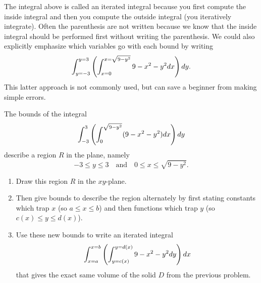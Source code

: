 The integral above is called an iterated integral because you first compute the inside integral and then you compute the outside integral (you iteratively integrate). Often the parenthesis are not written because we know that the inside integral should be performed first without writing the parenthesis. We could also explicitly emphasize which variables go with each bound by writing
$$\displaystyle\int_{y=-3}^{y=3} \left(\int_{x=0}^{x=\sqrt{9-y^2}}9-x^2-y^2 dx\right) dy.$$   
This latter approach is not commonly used, but can save a beginner from making simple errors. 

\begin{problem}
 The bounds of the integral 
$$\displaystyle\int_{-3}^{3} \left(\int_0^{\sqrt{9-y^2}}(9-x^2-y^2) dx\right) dy$$ 
describe a region $R$ in the plane, namely $$-3\leq y\leq 3 \quad\text{and}\quad 0\leq x\leq \sqrt{9-y^2}.$$  
\begin{enumerate}
	\item Draw this region $R$ in the $xy$-plane. 
	\item Then give bounds to describe the region alternately by first stating constants which trap $x$ (so $a\leq x\leq b$) and then functions which trap $y$ (so $c(x)\leq y \leq d(x)$). 
	\item Use these new bounds to write an iterated integral 
				$$\displaystyle\int_{x=a}^{x=b} \left(\int_{y=c(x)}^{y=d(x)}9-x^2-y^2 dy\right) dx$$   
				that gives the exact same volume of the solid $D$ from the previous problem.
\end{enumerate}
\end{problem}


